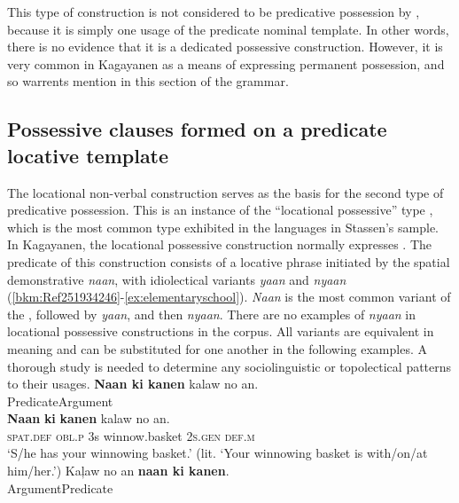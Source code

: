 This type of construction is not considered to be predicative possession by \citet{stassen2009}, because it is simply one usage of the predicate nominal template. In other words, there is no evidence that it is a dedicated possessive construction. However, it is very common in Kagayanen as a means of expressing permanent possession, and so warrents mention in this section of the grammar. 

\subsection{Possessive clauses formed on a predicate locative template}
\label{sec:predicativepossession-predicatelocative}

The locational non-verbal construction serves as the basis for the second type of predicative possession. This is an instance of the “locational possessive” type \citep[47]{stassen2009}, which is the most common type exhibited in the languages in Stassen’s sample. In Kagayanen, the locational possessive construction normally expresses . The predicate of this construction consists of a locative phrase initiated by the spatial demonstrative \textit{naan}, with idiolectical variants \textit{yaan} and \textit{nyaan} ({\ref{bkm:Ref251934246}-\ref{ex:elementaryschool}}). \textit{Naan} is the most common variant of the , followed by \textit{yaan}, and then \textit{nyaan}. There are no examples of \textit{nyaan} in locational possessive constructions in the corpus. All variants are equivalent in meaning and can be substituted for one another in the following examples. A thorough study is needed to determine any sociolinguistic or topolectical patterns to their usages.
\ea
\label{bkm:Ref251934246}
\textbf{Naan  ki  kanen}  kalaw  no  an. \\\smallskip
Predicate\hspace{2.2cm}Argument \\
\gll \textbf{Naan}  \textbf{ki}  \textbf{kanen}  kalaw  no  an. \\
\textsc{spat.def}  \textsc{obl.p}  3s  winnow.basket  2\textsc{s.gen}  \textsc{def.m} \\
\glt ‘S/he has your winnowing basket.’ (lit. ‘Your winnowing basket is with/on/at him/her.’)
\z
\ea
\label{bkm:Ref429141918}
Kaļaw  no  an  \textbf{naan  ki  kanen}. \\\smallskip
Argument\hspace{3cm}Predicate \\
